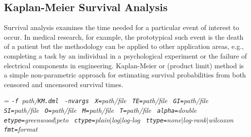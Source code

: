 \subsection{Kaplan-Meier Survival Analysis}
\label{sec:kaplan-meier}

\smallskip


Survival analysis examines the time needed for a particular event of interest to occur.
In medical research, for example, the prototypical such event is the death of a patient but the methodology can be applied to other application areas, e.g., completing a task by an individual in a psychological experiment or the failure of electrical components in engineering.   
Kaplan-Meier or (product limit) method is a simple non-parametric approach for estimating survival probabilities from both censored and uncensored survival times.\\

 

\smallskip
{}
\smallskip

{\hangindent=\parindent\noindent\it%
{\tt{}-f }path/\/{\tt{}KM.dml}
{\tt{} -nvargs}
{\tt{} X=}path/file
{\tt{} TE=}path/file
{\tt{} GI=}path/file
{\tt{} SI=}path/file
{\tt{} O=}path/file
{\tt{} M=}path/file
{\tt{} T=}path/file
{\tt{} alpha=}double
{\tt{} etype=}greenwood$\mid$peto
{\tt{} ctype=}plain$\mid$log$\mid$log-log
{\tt{} ttype=}none$\mid$log-rank$\mid$wilcoxon
{\tt{} fmt=}format

}

